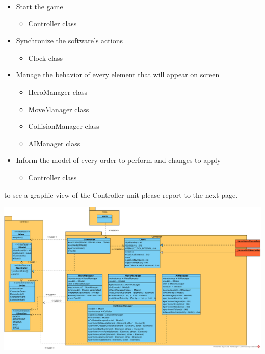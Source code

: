 \documentclass{report}
\begin{document}
\begin{itemize}
\item Start the game
	\begin{itemize}
	\item Controller class
	\end{itemize}
\item Synchronize the software’s actions
	\begin{itemize}
	\item Clock class
	\end{itemize}
\item Manage the behavior of every element that will appear on screen
	\begin{itemize}
	\item HeroManager class
	\item MoveManager class
	\item CollisionManager class
	\item AIManager class
	\end{itemize}
\item Inform the model of every order to perform and changes to apply
	\begin{itemize}
	\item Controller class
	\end{itemize}
\end{itemize}

to see a graphic view of the Controller unit please report to the next page.

\begin{landscape}

\vspace*{\fill}

\includegraphics[scale=0.65]{resources/SVG/controler.pdf}

\vspace*{\fill}

\end{landscape}
\end{document}
